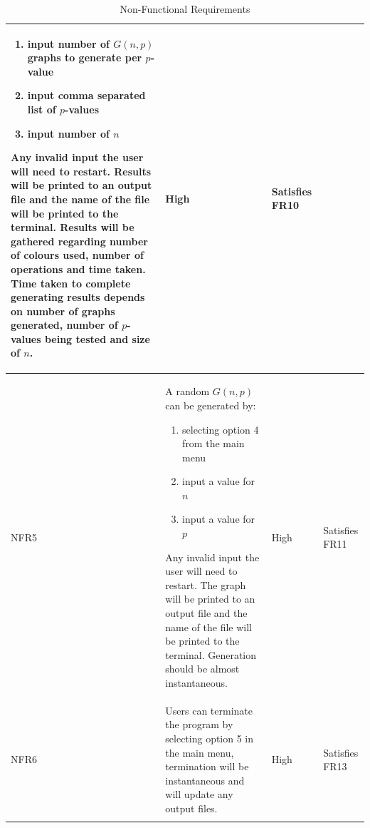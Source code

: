 \begin{longtable}{|m{}|m{}|m{}|m{}|}
\begin{enumerate}
        \item input number of $G(n, p)$ graphs to generate per $p$-value
        \item input comma separated list of $p$-values
        \item input number of $n$
    \end{enumerate}
    Any invalid input the user will need to restart. Results will be printed to an output file and the name of the file will be printed to the terminal. Results will be gathered regarding number of colours used, number of operations and time taken. Time taken to complete generating results depends on number of graphs generated, number of $p$-values being tested and size of $n$.
    & High & Satisfies FR10 \\
\hline
NFR5 & A random $G(n, p)$ can be generated by:
    \begin{enumerate}
        \item selecting option 4 from the main menu
        \item input a value for $n$
        \item input a value for $p$
    \end{enumerate}
    Any invalid input the user will need to restart. The graph will be printed to an output file and the name of the file will be printed to the terminal. Generation should be almost instantaneous. 
    & High & Satisfies FR11 \\
\hline
NFR6 & Users can terminate the program by selecting option 5 in the main menu, termination will be instantaneous and will update any output files. & High & Satisfies FR13 \\
\hline
\caption{Non-Functional Requirements}
\label{tab:NonFuncReqs}
\end{longtable}
   
